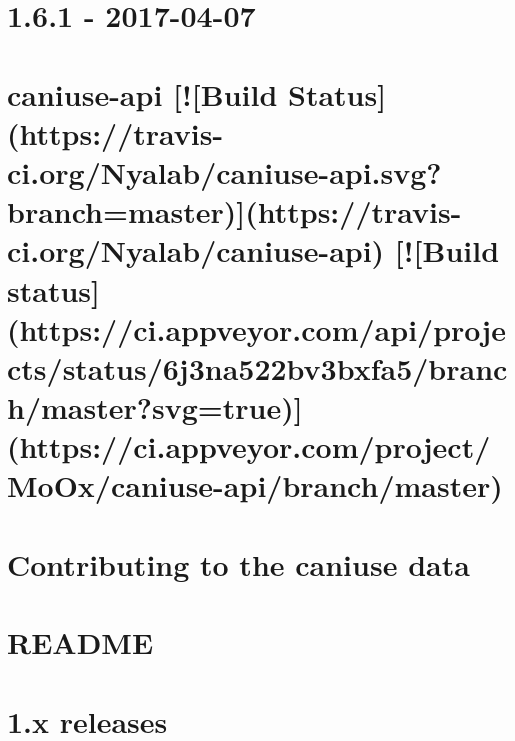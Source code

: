 \documentclass[twoside]{book}
\newcommand{\+}{\discretionary{\mbox{\scriptsize$\hookleftarrow$}}{}{}}
\begin{document}
\chapter{1.6.1 -\/ 2017-\/04-\/07}
\label{md__c_1_workspace_demo_src_main_script_node_modules_caniuse-api__c_h_a_n_g_e_l_o_g}

\chapter{caniuse-\/api \mbox{[}!\mbox{[}Build Status\mbox{]}(https\+://travis-\/ci.org/\+Nyalab/caniuse-\/api.svg?branch=master)\mbox{]}(https\+://travis-\/ci.org/\+Nyalab/caniuse-\/api) \mbox{[}!\mbox{[}Build status\mbox{]}(https\+://ci.appveyor.\+com/api/projects/status/6j3na522bv3bxfa5/branch/master?svg=true)\mbox{]}(https\+://ci.appveyor.\+com/project/\+Mo\+Ox/caniuse-\/api/branch/master)}
\label{md__c_1_workspace_demo_src_main_script_node_modules_caniuse-api__r_e_a_d_m_e}

\chapter{Contributing to the caniuse data}
\label{md__c_1_workspace_demo_src_main_script_node_modules_caniuse-db__c_o_n_t_r_i_b_u_t_i_n_g}

\chapter{R\+E\+A\+D\+ME}
\label{md__c_1_workspace_demo_src_main_script_node_modules_caniuse-db__r_e_a_d_m_e}

\chapter{1.x releases}
\label{md__c_1_workspace_demo_src_main_script_node_modules_caniuse-lite__c_h_a_n_g_e_l_o_g}

\end{document}
